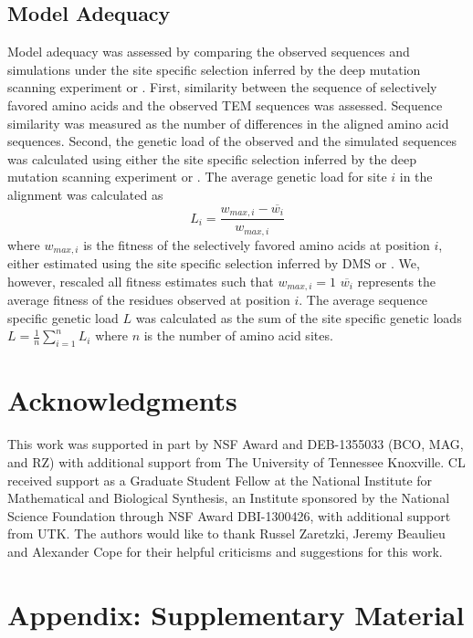 \subsection{Model Adequacy}

Model adequacy was assessed by comparing the observed sequences and simulations under the site specific selection inferred by the deep mutation scanning experiment or \selac.
First, similarity between the sequence of selectively favored amino acids and the observed TEM sequences was assessed.
Sequence similarity was measured as the number of differences in the aligned amino acid sequences.
Second, the genetic load of the observed and the simulated sequences was calculated using either the site specific selection inferred by the deep mutation scanning experiment or \selac.
The average genetic load for site $i$ in the alignment was calculated as
\begin{equation}
L_i = \frac{w_{max,i} - \overline{w_i}}{w_{max,i}}
\end{equation}
where $w_{max,i}$ is the fitness of the selectively favored amino acids at position $i$, either estimated using the site specific selection inferred by DMS or \selac.
We, however, rescaled all fitness estimates such that $w_{max,i} = 1$
$\overline{w_i}$ represents the average fitness of the residues observed at position $i$.
The average sequence specific genetic load $L$ was calculated as the sum of the site specific genetic loads $L = \frac{1}{n}\sum_{i=1}^n L_i$ where $n$ is the number of amino acid sites.

\section{Acknowledgments}

This work was supported in part by NSF Award and DEB-1355033 (BCO, MAG, and RZ) with additional support from The University of Tennessee Knoxville. 
CL received support as a Graduate Student Fellow at the National Institute for Mathematical and Biological Synthesis, an Institute sponsored by the National Science Foundation through NSF Award DBI-1300426, with additional support from UTK. 
The authors would like to thank Russel Zaretzki, Jeremy Beaulieu and Alexander Cope for their helpful criticisms and suggestions for this work.



\clearpage
\section{Appendix: Supplementary Material}

